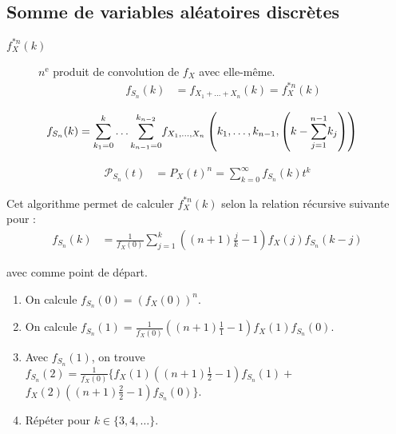 \documentclass[10pt, french]{article}
\begin{document}
\begin{multicols*}{2}
\columnbreak
\subsection{Somme de variables aléatoires discrètes}
\begin{distributions}[Notation]
\begin{description}
	\item[$f_{X}^{\ast n}(k)$]	$n^{\text{e}}$ produit de convolution de $f_{X}$ avec elle-même.	
		\begin{align*}
			f_{S_{n}}(k)	
			&=	f_{X_{1} + \dots + X_{n}}(k)	=	f_{X}^{\ast n}(k)
		\end{align*}
\end{description}
\end{distributions}

\begin{align*}
	f_{S_{n}}(k)
	&=	\overset{k}{\underset{k_{1}	=	0}{\sum}}\dots\overset{k_{n	-	2}}{\underset{k_{n	-	1}	=	0}{\sum}} 
	f_{X_{1}, \dots, X_{n}}\left(k_{1}, \dots, k_{n - 1}, \left(k - \overset{n	-	1}{\underset{j	=	1}{\sum}}k_{j} \right) \right)
\end{align*}

\begin{align*}
	\mathcal{P}_{S_{n}}(t)
	&=	P_{X}(t)^{n}	
	=	\sum_{k = 0}^{\infty} f_{S_{n}}(k) t^{k}
\end{align*}

\begin{algo2}
Cet algorithme permet de calculer $f_{X}^{\ast n}(k)$ selon la relation récursive suivante pour  :
\begin{align*}
	f_{S_{n}}(k)
	&=	\frac{1}{f_{X}(0)} \sum_{j = 1}^{k} \left((n + 1)\frac{j}{k} - 1\right)f_{X}(j)f_{S_{n}}(k - j)
\end{align*}

avec  comme point de départ.

\tcbline

\begin{enumerate}
	\item	On calcule $f_{S_{n}}(0)	=	\left(f_{X}(0)\right)^{n}$.
	\item	On calcule $f_{S_{n}}(1)	=	\frac{1}{f_{X}(0)} \left((n + 1)\frac{1}{1} - 1\right)f_{X}(1)f_{S_{n}}(0)$.
	\item	Avec $f_{S_{n}}(1)$, on trouve $f_{S_{n}}(2)	=	\frac{1}{f_{X}(0)} \bigg\{ f_{X}(1)\left((n + 1)\frac{1}{2} - 1\right)f_{S_{n}}(1)	+$ $ f_{X}(2)\left((n + 1)\frac{2}{2} - 1\right)f_{S_{n}}(0) \bigg\}$.
	\item	Répéter pour $k \in \{3, 4, \dots\}$.
\end{enumerate}
\end{algo2}


\end{multicols*}
\end{document}
